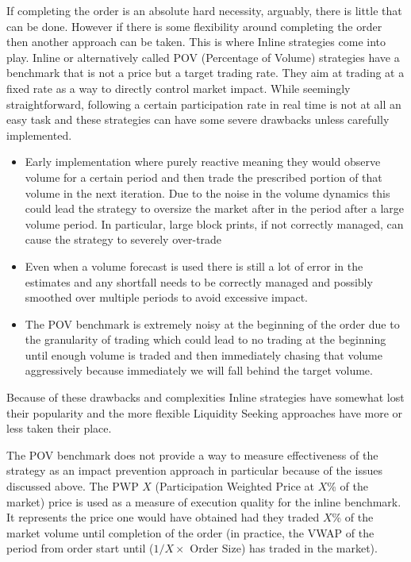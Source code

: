 If completing the order is an absolute hard necessity, arguably, there is little that can be done. However if there is some flexibility around completing the order then another approach can be taken. This is where Inline strategies come into play. Inline or alternatively called POV (Percentage of Volume) strategies have a benchmark that is not a price but a target trading rate. They aim at trading at a fixed rate as a way to directly control market impact. While seemingly straightforward, following a certain participation rate in real time is not at all an easy task and these strategies can have some severe drawbacks unless carefully implemented.


\begin{itemize}
\item Early implementation where purely reactive meaning they would observe volume for a certain period and then trade the prescribed portion of that volume in the next iteration. Due to the noise in the volume dynamics this could lead the strategy to oversize the market after in the period after a large volume period. In particular, large block prints, if not correctly managed, can cause the strategy to severely over-trade

\item Even when a volume forecast is used there is still a lot of error in the estimates and any shortfall needs to be correctly managed and possibly smoothed over multiple periods to avoid excessive impact.

\item The POV benchmark is extremely noisy at the beginning of the order due to the granularity of trading which could lead to no trading at the beginning until enough volume is traded and then immediately chasing that volume aggressively because immediately we will fall behind the target volume.
\end{itemize}


Because of these drawbacks and complexities Inline strategies have somewhat lost their popularity and the more flexible Liquidity Seeking approaches  have more or less taken their place.


The POV benchmark does not provide a way to measure effectiveness of the strategy as an impact prevention approach in particular because of the issues discussed above. The PWP $X$ (Participation Weighted Price at $X$\% of the market) price is used as a measure of execution quality for the inline benchmark. It represents the price one would have obtained had they traded $X$\% of the market volume until completion of the order (in practice, the VWAP of the period from order start until ($1/X \times$ Order Size) has traded in the market).

